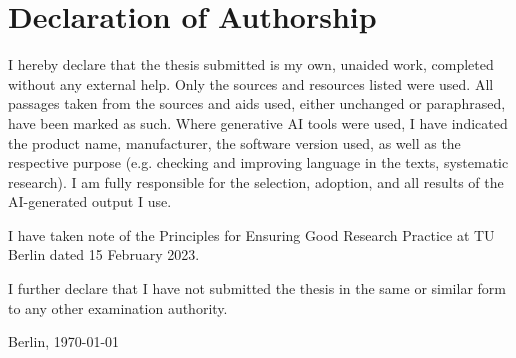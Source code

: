 \newpage


\section*{Declaration of Authorship}

I hereby declare that the thesis submitted is my own, unaided work, completed without any external help.
Only the sources and resources listed were used.
All passages taken from the sources and aids used, either unchanged or paraphrased, have been marked as such.
Where generative AI tools were used, I have indicated the product name, manufacturer, the software version used, as well as the respective purpose (e.g. checking and improving language in the texts, systematic research).
I am fully responsible for the selection, adoption, and all results of the AI-generated output I use.

I have taken note of the Principles for Ensuring Good Research Practice at TU Berlin dated 15 February 2023.

I further declare that I have not submitted the thesis in the same or similar form to any other examination authority.

\vspace{2cm}

\noindent
Berlin, \today

\vspace{3cm}


\begin{flushright}
    \hspace*{6cm}%
\dotfill\\

\textit{\tAuthor}

\end{flushright}


